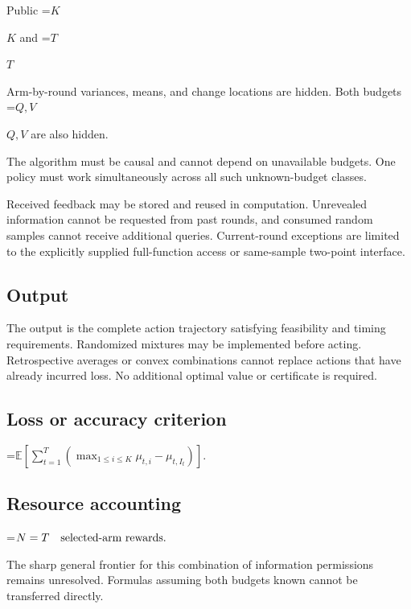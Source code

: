 \documentclass[10pt,a4paper]{article}
\newcommand{\AtlasMath}[1]{\par\begingroup\centering\setbox0=\hbox{$\displaystyle #1$}\ifdim\wd0>1.4\linewidth\typeout{ATLAS WIDE FORMULA: \the\wd0}\fi\ifdim\wd0>\linewidth\resizebox{\linewidth}{!}{\box0}\else\box0\fi\par\endgroup}
\newcommand{\AtlasInlineMath}[1]{\begingroup\setbox0=\hbox{$#1$}\ifdim\wd0>.4\linewidth\endgroup\AtlasMath{#1}\else\endgroup$#1$\fi}
\begin{document}
Public \AtlasInlineMath{K} and \AtlasInlineMath{T}



Arm-by-round variances, means, and change locations are hidden. Both budgets \AtlasInlineMath{Q,V} are also hidden.



The algorithm must be causal and cannot depend on unavailable budgets. One policy must work simultaneously across all such unknown-budget classes.



Received feedback may be stored and reused in computation. Unrevealed information cannot be requested from past rounds, and consumed random samples cannot receive additional queries. Current-round exceptions are limited to the explicitly supplied full-function access or same-sample two-point interface.



\subsection{Output}


The output is the complete action trajectory satisfying feasibility and timing requirements. Randomized mixtures may be implemented before acting. Retrospective averages or convex combinations cannot replace actions that have already incurred loss. No additional optimal value or certificate is required.



\subsection{Loss or accuracy criterion}



\AtlasMath{\mathbb{E}\!\left[\sum_{t=1}^{T}\left(\max_{1\le i\le K}\mu_{t,i}-\mu_{t,I_t}\right)\right].}




\subsection{Resource accounting}



\AtlasMath{N=T\quad\text{\text{selected-arm rewards}}.}




The sharp general frontier for this combination of information permissions remains unresolved. Formulas assuming both budgets known cannot be transferred directly.
\end{document}
